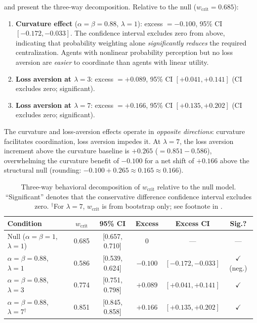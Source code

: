 \documentclass[11pt]{article}
\newcommand{\wcrit}{w_{\mathrm{crit}}}
\begin{document}
 and  present the
three-way decomposition.
Relative to the null ($\wcrit = 0.685$):

\begin{enumerate}
  \item \textbf{Curvature effect} ($\alpha{=}\beta{=}0.88$, $\lambda{=}1$):
        excess $= -0.100$, 95\% CI $[-0.172, -0.033]$.
        The confidence interval excludes zero from above, indicating that
        probability weighting alone \emph{significantly reduces} the
        required centralization.
        Agents with nonlinear probability perception but no loss aversion
        are \emph{easier} to coordinate than agents with linear utility.

  \item \textbf{Loss aversion at $\lambda{=}3$}:
        excess $= +0.089$, 95\% CI $[+0.041, +0.141]$
        (CI excludes zero; significant).

  \item \textbf{Loss aversion at $\lambda{=}7$}:
        excess $= +0.166$, 95\% CI $[+0.135, +0.202]$
        (CI excludes zero; significant).
\end{enumerate}

The curvature and loss-aversion effects operate in \emph{opposite
directions}: curvature facilitates coordination, loss aversion impedes it.
At $\lambda{=}7$, the loss aversion increment above the curvature baseline
is $+0.265$ ($= 0.851 - 0.586$), overwhelming the curvature benefit
of $-0.100$ for a net shift of $+0.166$ above the structural null
(rounding: $-0.100 + 0.265 \approx 0.165 \approx 0.166$).

\begin{table}[t]
\centering
\caption{Three-way behavioral decomposition of $\wcrit$ relative to the
null model. ``Significant'' denotes that the conservative difference
confidence interval excludes zero. $^{\dagger}$For $\lambda{=}7$,
$\wcrit$ is from bootstrap only; see footnote in
.}
\label{tab:decomposition}
\small
\begin{tabular}{lccccc}
\toprule
Condition & $\wcrit$ & 95\% CI & Excess & Excess CI & Sig.? \\
\midrule
Null ($\alpha{=}\beta{=}1$, $\lambda{=}1$) & 0.685 & [0.657, 0.710] & 0 & --- & --- \\
$\alpha{=}\beta{=}0.88$, $\lambda{=}1$ & 0.586 & [0.539, 0.624] & $-0.100$ & $[-0.172, -0.033]$ & $\checkmark$ (neg.) \\
$\alpha{=}\beta{=}0.88$, $\lambda{=}3$ & 0.774 & [0.751, 0.798] & $+0.089$ & $[+0.041, +0.141]$ & $\checkmark$ \\
$\alpha{=}\beta{=}0.88$, $\lambda{=}7$$^{\dagger}$ & 0.851 & [0.845, 0.858] & $+0.166$ & $[+0.135, +0.202]$ & $\checkmark$ \\
\bottomrule
\end{tabular}
\end{table}
\end{document}
